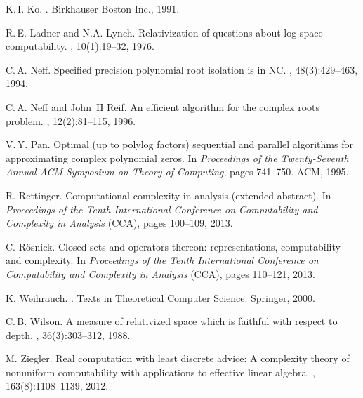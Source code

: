 \documentclass[envcountsect,envcountsame,orivec,oribibl]{llncs}
\begin{document}
\begin{thebibliography}{10}
K.\,I. Ko.
.
\newblock Birkhauser Boston Inc., 1991.

R.\,E. Ladner and N.A. Lynch.
\newblock Relativization of questions about log space computability.
, 10(1):19--32, 1976.

C.\,A. Neff.
\newblock Specified precision polynomial root isolation is in $\mathrm{NC}$.
, 48(3):429--463, 1994.

C.\,A. Neff and John~H Reif.
\newblock An efficient algorithm for the complex roots problem.
, 12(2):81--115, 1996.

V.\,Y. Pan.
\newblock Optimal (up to polylog factors) sequential and parallel algorithms
  for approximating complex polynomial zeros.
\newblock In {\em Proceedings of the Twenty-Seventh Annual ACM Symposium on
  Theory of Computing}, pages 741--750. ACM, 1995.

R. Rettinger. 
\newblock Computational complexity in analysis (extended abstract). 
\newblock In \emph{Proceedings of the Tenth International Conference on Computability and Complexity in Analysis} (CCA), pages 100--109, 2013.

C. R\"osnick. 
\newblock Closed sets and operators thereon: representations, computability and complexity. 
\newblock In \emph{Proceedings of the Tenth International Conference on Computability and Complexity in Analysis} (CCA), pages 110--121, 2013.

K. Weihrauch.
.
\newblock Texts in Theoretical Computer Science. Springer, 2000.

C.\,B. Wilson.
\newblock A measure of relativized space which is faithful with respect to
  depth.
, 36(3):303--312, 1988.

M. Ziegler. 
\newblock Real computation with least discrete advice: A complexity theory of nonuniform computability with applications to effective linear algebra.
, 163(8):1108--1139, 2012. 


\end{thebibliography}
\end{document}
